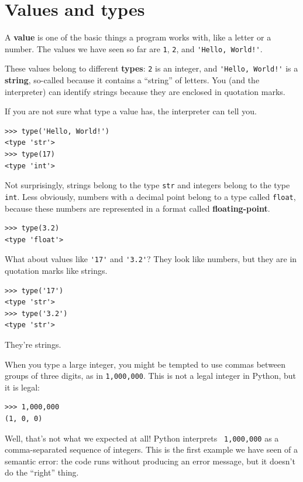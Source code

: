 \documentclass[10pt]{book}
\begin{document}
\section{Values and types}

A {\bf value} is one of the basic things a program works with,
like a letter or a
number.  The values we have seen so far
are {\tt 1}, {\tt 2}, and
\verb"'Hello, World!'".

These values belong to different {\bf types}:
{\tt 2} is an integer, and \verb"'Hello, World!'" is a {\bf string},
so-called because it contains a ``string'' of letters.
You (and the interpreter) can identify
strings because they are enclosed in quotation marks.

If you are not sure what type a value has, the interpreter can tell you.

\begin{verbatim}
>>> type('Hello, World!')
<type 'str'>
>>> type(17)
<type 'int'>
\end{verbatim}
%
Not surprisingly, strings belong to the type {\tt str} and
integers belong to the type {\tt int}.  Less obviously, numbers
with a decimal point belong to a type called {\tt float},
because these numbers are represented in a
format called {\bf floating-point}.

\begin{verbatim}
>>> type(3.2)
<type 'float'>
\end{verbatim}
%
What about values like \verb"'17'" and \verb"'3.2'"?
They look like numbers, but they are in quotation marks like
strings.

\begin{verbatim}
>>> type('17')
<type 'str'>
>>> type('3.2')
<type 'str'>
\end{verbatim}
%
They're strings.

When you type a large integer, you might be tempted to use commas
between groups of three digits, as in {\tt 1,000,000}.  This is not a
legal integer in Python, but it is legal:

\begin{verbatim}
>>> 1,000,000
(1, 0, 0)
\end{verbatim}
%
Well, that's not what we expected at all!  Python interprets {\tt
  1,000,000} as a comma-separated sequence of integers.
This is the first example we have seen of a semantic error: the code
runs without producing an error message, but it doesn't do the
``right'' thing.
\end{document}
